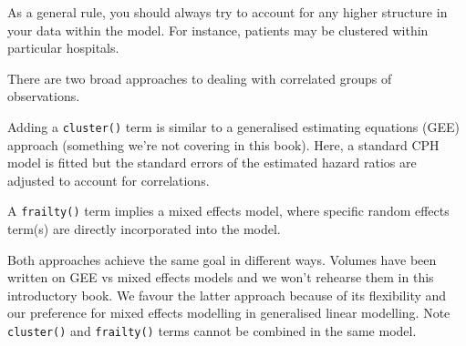 \documentclass[
  12pt,
  krantz2]{krantz}
\makeatletter
\newenvironment{Shaded}{\begin{snugshade}}{\end{snugshade}}
\newcommand{\CommentTok}[1]{\textcolor[rgb]{0.56,0.35,0.01}{\textit{#1}}}
\newcommand{\DataTypeTok}[1]{\textcolor[rgb]{0.13,0.29,0.53}{#1}}
\newcommand{\DecValTok}[1]{\textcolor[rgb]{0.00,0.00,0.81}{#1}}
\newcommand{\KeywordTok}[1]{\textcolor[rgb]{0.13,0.29,0.53}{\textbf{#1}}}
\newcommand{\NormalTok}[1]{#1}
\newcommand{\OperatorTok}[1]{\textcolor[rgb]{0.81,0.36,0.00}{\textbf{#1}}}
\newcommand{\StringTok}[1]{\textcolor[rgb]{0.31,0.60,0.02}{#1}}
\newenvironment{kframe}{%
\medskip{}
\setlength{\fboxsep}{.8em}
 \def\at@end@of@kframe{}%
 \ifinner\ifhmode%
  \def\at@end@of@kframe{\end{minipage}}%
  \begin{minipage}{\columnwidth}%
 \fi\fi%
 \def\FrameCommand##1{\hskip\@totalleftmargin \hskip-\fboxsep
 \colorbox{shadecolor}{##1}\hskip-\fboxsep
     \hskip-\linewidth \hskip-\@totalleftmargin \hskip\columnwidth}%
 \MakeFramed {\advance\hsize-\width
   \@totalleftmargin\z@ \linewidth\hsize
   \@setminipage}}%
 {\par\unskip\endMakeFramed%
 \at@end@of@kframe}
\renewenvironment{Shaded}{\begin{kframe}}{\end{kframe}}
\makeatother
\begin{document}
As a general rule, you should always try to account for any higher structure in your data within the model.
For instance, patients may be clustered within particular hospitals.

There are two broad approaches to dealing with correlated groups of observations.

Adding a \texttt{cluster()} term is similar to a generalised estimating equations (GEE) approach (something we're not covering in this book).
Here, a standard CPH model is fitted but the standard errors of the estimated hazard ratios are adjusted to account for correlations.

A \texttt{frailty()} term implies a mixed effects model, where specific random effects term(s) are directly incorporated into the model.

Both approaches achieve the same goal in different ways.
Volumes have been written on GEE vs mixed effects models and we won't rehearse them in this introductory book.
We favour the latter approach because of its flexibility and our preference for mixed effects modelling in generalised linear modelling.
Note \texttt{cluster()} and \texttt{frailty()} terms cannot be combined in the same model.

\begin{Shaded}
\end{Shaded}
\end{document}
